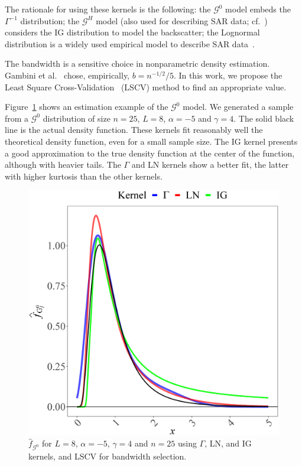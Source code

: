 \documentclass[twocolumn]{svjour3}
\begin{document}
The rationale for using these kernels is the following:
the $\mathcal{G}^0$ model embeds the $\Gamma^{-1}$ distribution;
the $\mathcal{G}^H$ model (also used for describing SAR data; cf.~\cite{PolarimetricSegmentationBSplinesMSSP}) considers the IG distribution to model the backscatter;
the Lognormal distribution is a widely used empirical model to describe SAR data~\cite{Gao2010}. 

The bandwidth is a sensitive choice in nonparametric density estimation. 
Gambini et al.~\cite{gambini2015} chose, empirically, $b=n^{-1/2}/5$. 
In this work, we propose the Least Square Cross-Validation~\cite{Wu1997} (LSCV) method to find an appropriate value.

Figure~\ref{EstimacionLNyGAyIG} shows an estimation example of the $\mathcal{G}^0$ model. 
We generated a sample from a $\mathcal{G}^0$ distribution of size $n=25$, $L = 8$, $\alpha=-5$ and $\gamma=4$. 
The solid black line is the actual density function. 
These kernels fit reasonably well the theoretical density function, even for a small sample size. 
The IG kernel presents a good approximation to the true density function at the center of the function, although with heavier tails. 
The $\Gamma$ and LN kernels show a better fit, the latter with higher kurtosis than the other kernels.

\begin{figure}[hbt]
\centering
\includegraphics[width=0.8\linewidth]{../Figures/NucleosGALNyIG}
\caption{$\widehat{f}_{\mathcal{G}^0}$ for $L=8$, $\alpha=-5$, $\gamma=4$ and $n=25$ using $\Gamma$, LN, and IG kernels, and LSCV for bandwidth selection.}\label{EstimacionLNyGAyIG}
\end{figure}
\end{document}
